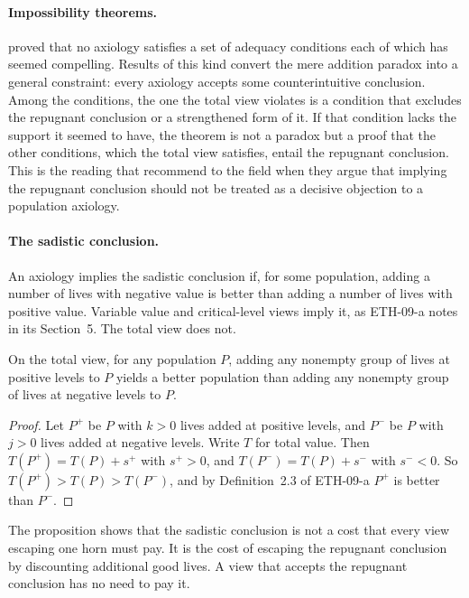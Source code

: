 \documentclass{situationist-preprint}
\begin{document}
\paragraph{Impossibility theorems.} \citet{Arrhenius2000} proved that no axiology satisfies a set of adequacy conditions each of which has seemed compelling. Results of this kind convert the mere addition paradox into a general constraint: every axiology accepts some counterintuitive conclusion. Among the conditions, the one the total view violates is a condition that excludes the repugnant conclusion or a strengthened form of it. If that condition lacks the support it seemed to have, the theorem is not a paradox but a proof that the other conditions, which the total view satisfies, entail the repugnant conclusion. This is the reading that \citet{Zuber2021} recommend to the field when they argue that implying the repugnant conclusion should not be treated as a decisive objection to a population axiology.

\paragraph{The sadistic conclusion.} An axiology implies the sadistic conclusion if, for some population, adding a number of lives with negative value is better than adding a number of lives with positive value. Variable value and critical-level views imply it, as ETH-09-a notes in its Section~5. The total view does not.

\begin{proposition}\label{p:sadistic}
On the total view, for any population $P$, adding any nonempty group of lives at positive levels to $P$ yields a better population than adding any nonempty group of lives at negative levels to $P$.
\end{proposition}

\begin{proof}
Let $P^{+}$ be $P$ with $k > 0$ lives added at positive levels, and $P^{-}$ be $P$ with $j > 0$ lives added at negative levels. Write $T$ for total value. Then $T(P^{+}) = T(P) + s^{+}$ with $s^{+} > 0$, and $T(P^{-}) = T(P) + s^{-}$ with $s^{-} < 0$. So $T(P^{+}) > T(P) > T(P^{-})$, and by Definition~2.3 of ETH-09-a $P^{+}$ is better than $P^{-}$.
\end{proof}

The proposition shows that the sadistic conclusion is not a cost that every view escaping one horn must pay. It is the cost of escaping the repugnant conclusion by discounting additional good lives. A view that accepts the repugnant conclusion has no need to pay it.
\end{document}
